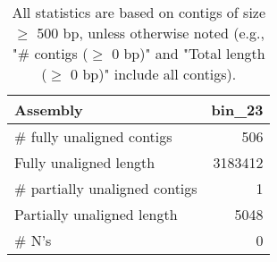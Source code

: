 \documentclass[12pt,a4paper]{article}
\begin{document}
\begin{table}[ht]
\begin{center}
\caption{All statistics are based on contigs of size $\geq$ 500 bp, unless otherwise noted (e.g., "\# contigs ($\geq$ 0 bp)" and "Total length ($\geq$ 0 bp)" include all contigs).}
\begin{tabular}{|l*{1}{|r}|}
\hline
Assembly & bin\_23 \\ \hline
\# fully unaligned contigs & 506 \\ \hline
Fully unaligned length & 3183412 \\ \hline
\# partially unaligned contigs & 1 \\ \hline
Partially unaligned length & 5048 \\ \hline
\# N's & 0 \\ \hline
\end{tabular}
\end{center}
\end{table}
\end{document}
